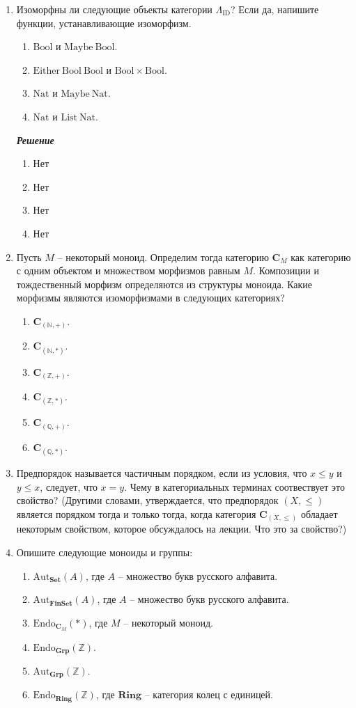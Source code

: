 \documentclass[draft]{article}
\newcommand{\cat}[1]{\mathbf{#1}}
\renewcommand{\C}{\cat{C}}
\newcommand{\Set}{\cat{Set}}
\newcommand{\FinSet}{\cat{FinSet}}
\newcommand{\Grp}{\cat{Grp}}
\newcommand{\fs}[1]{\mathrm{#1}}
\begin{document}
\begin{enumerate}

\item Изоморфны ли следующие объекты категории $\Lambda_\fs{ID}$? Если да, напишите функции, устанавливающие изоморфизм.
\begin{enumerate}
\item $\fs{Bool}$ и $\fs{Maybe\ Bool}$.
\item $\fs{Either\ Bool\ Bool}$ и $\fs{Bool} \times \fs{Bool}$.
\item $\fs{Nat}$ и $\fs{Maybe\ Nat}$.
\item $\fs{Nat}$ и $\fs{List\ Nat}$.
\end{enumerate}

\textit{\textbf{Решение}}
\begin{enumerate}
\item Нет
\item Нет
\item Нет
\item Нет
\end{enumerate}


\item Пусть $M$ -- некоторый моноид.
Определим тогда категорию $\C_M$ как категорию с одним объектом и множеством морфизмов равным $M$.
Композиции и тождественный морфизм определяются из структуры моноида.
Какие морфизмы являются изоморфизмами в следующих категориях?
\begin{enumerate}
\item $\C_{(\mathbb{N},+)}$.
\item $\C_{(\mathbb{N},*)}$.
\item $\C_{(\mathbb{Z},+)}$.
\item $\C_{(\mathbb{Z},*)}$.
\item $\C_{(\mathbb{Q},+)}$.
\item $\C_{(\mathbb{Q},*)}$.
\end{enumerate}

\item Предпорядок называется частичным порядком, если из условия, что $x \leq y$ и $y \leq x$, следует, что $x = y$.
Чему в категориальных терминах соотвествует это свойство?
(Другими словами, утверждается, что предпорядок $(X,\leq)$ является порядком тогда и только тогда, когда категория $\C_{(X,\leq)}$ обладает некоторым свойством,
которое обсуждалось на лекции. Что это за свойство?)

\item Опишите следующие моноиды и группы:
\begin{enumerate}
\item $\fs{Aut}_\Set(A)$, где $A$ -- множество букв русского алфавита.
\item $\fs{Aut}_{\FinSet}(A)$, где $A$ -- множество букв русского алфавита.
\item $\fs{Endo}_{\C_M}(*)$, где $M$ -- некоторый моноид.
\item $\fs{Endo}_\Grp(\mathbb{Z})$.
\item $\fs{Aut}_\Grp(\mathbb{Z})$.
\item $\fs{Endo}_\cat{Ring}(\mathbb{Z})$, где $\cat{Ring}$ -- категория колец с единицей. 


\end{enumerate}
\end{enumerate}
\end{document}
